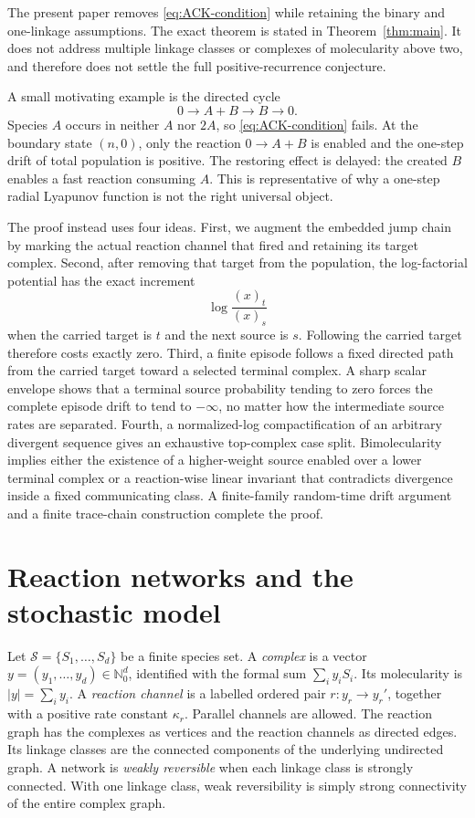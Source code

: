 The present paper removes \eqref{eq:ACK-condition} while retaining the binary
and one-linkage assumptions.  The exact theorem is stated in
Theorem~\ref{thm:main}.  It does not address multiple linkage classes or
complexes of molecularity above two, and therefore does not settle the full
positive-recurrence conjecture.

A small motivating example is the directed cycle
\begin{equation}\label{eq:stress}
  0\longrightarrow A+B\longrightarrow B\longrightarrow0.
\end{equation}
Species \(A\) occurs in neither \(A\) nor \(2A\), so
\eqref{eq:ACK-condition} fails.  At the boundary state \((n,0)\), only the
reaction \(0\to A+B\) is enabled and the one-step drift of total population
is positive.  The restoring effect is delayed: the created \(B\) enables a
fast reaction consuming \(A\).  This is representative of why a one-step
radial Lyapunov function is not the right universal object.

The proof instead uses four ideas.  First, we augment the embedded jump chain
by marking the actual reaction channel that fired and retaining its target
complex.  Second, after removing that target from the population, the
log-factorial potential has the exact increment
\[
  \log\frac{(x)_t}{(x)_s}
\]
when the carried target is \(t\) and the next source is \(s\).  Following the
carried target therefore costs exactly zero.  Third, a finite episode follows
a fixed directed path from the carried target toward a selected terminal
complex.  A sharp scalar envelope shows that a terminal source probability
tending to zero forces the complete episode drift to tend to \(-\infty\), no
matter how the intermediate source rates are separated.  Fourth, a
normalized-log compactification of an arbitrary divergent sequence gives an
exhaustive top-complex case split.  Bimolecularity implies either the
existence of a higher-weight source enabled over a lower terminal complex or
a reaction-wise linear invariant that contradicts divergence inside a fixed
communicating class.  A finite-family random-time drift argument and a finite
trace-chain construction complete the proof.

\section{Reaction networks and the stochastic model}\label{sec:model}

Let \(\mathcal S=\{S_1,\dots,S_d\}\) be a finite species set.  A
\emph{complex} is a vector \(y=(y_1,\dots,y_d)\in\mathbb N_0^d\), identified
with the formal sum \(\sum_i y_iS_i\).  Its molecularity is
\(|y|=\sum_i y_i\).  A \emph{reaction channel} is a labelled ordered pair
\(r:y_r\to y_r'\), together with a positive rate constant \(\kappa_r\).
Parallel channels are allowed.  The reaction graph has the complexes as
vertices and the reaction channels as directed edges.  Its linkage classes
are the connected components of the underlying undirected graph.  A network
is \emph{weakly reversible} when each linkage class is strongly connected.
With one linkage class, weak reversibility is simply strong connectivity of
the entire complex graph.

